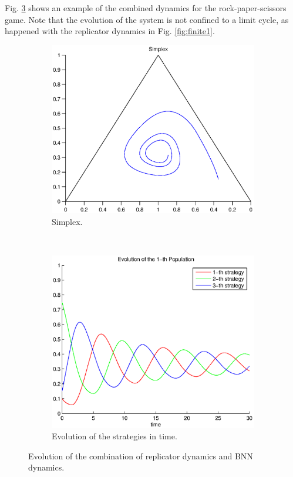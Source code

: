 \documentclass[a4paper,10pt]{article}
\begin{document}
Fig. \ref{fig:rps_combined} shows an example of the combined dynamics for the rock-paper-scissors game. Note that the evolution of the system is not confined to a limit cycle, as happened with the replicator dynamics in Fig.  \ref{fig:finite1}.

\begin{figure}[h]
  \centering
  \begin{subfigure}[b]{0.4\textwidth}
	  \includegraphics[width=\textwidth]{./images/test_combined.eps}
	  \caption{Simplex.}
	  \label{fig:test_combined_simplex}
  \end{subfigure}
  ~ 
  \begin{subfigure}[b]{0.45\textwidth}
	  \includegraphics[width=\textwidth]{./images/test_combined_ev.eps}
	  \caption{Evolution of the strategies in time.}
	  \label{fig:test_combined_ev}
  \end{subfigure}
  \caption{Evolution of the combination of replicator dynamics and BNN dynamics.}
  \label{fig:rps_combined}
\end{figure}
\end{document}
